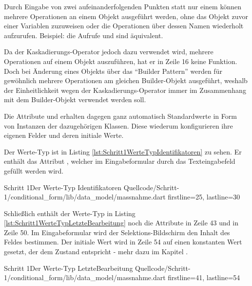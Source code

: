 Durch Eingabe von zwei aufeinanderfolgenden Punkten  statt nur einem  können mehrere Operationen an einem Objekt ausgeführt werden, ohne  das Objekt zuvor einer Variablen zuzuweisen oder die Operationen über dessen Namen wiederholt aufzurufen. Beispiel: die Aufrufe   und  sind äquivalent.

Da der Kaskadierungs-Operator jedoch dazu verwendet wird, mehrere Operationen auf einem Objekt auszuführen, hat er in Zeile 16 keine Funktion.
Doch bei Änderung eines Objekts über das \enquote{Builder Pattern} werden für gewöhnlich mehrere Operationen am gleichen Builder-Objekt ausgeführt, weshalb der Einheitlichkeit wegen der Kaskadierungs-Operator immer im Zusammenhang mit dem Builder-Objekt verwendet werden soll.

Die Attribute  und   erhalten dagegen ganz automatisch Standardwerte in Form von Instanzen der dazugehörigen Klassen.
Diese wiederum konfigurieren ihre eigenen Felder und deren initiale Werte.



Der Werte-Typ  ist in Listing \ref{lst:Schritt1WerteTypIdentifikatoren} zu sehen.
Er enthält das Attribut , welcher im Eingabeformular durch das Texteingabefeld gefüllt werden wird.

\begin{alexlisting}{Schritt 1}{Der Werte-Typ Identifikatoren}
  {Quellcode/Schritt-1/conditional_form/lib/data_model/massnahme.dart}
  {firstline=25, lastline=30}
  \label{lst:Schritt1WerteTypIdentifikatoren}
\end{alexlisting}

Schließlich enthält der Werte-Typ  in Listing \ref{lst:Schritt1WerteTypLetzteBearbeitung} noch die Attribute  in Zeile 43 und  in Zeile 50.
Im Eingabeformular wird der Selektions-Bildschirm den Inhalt des Feldes  bestimmen.
Der initiale Wert wird in Zeile 54 auf einen konstanten Wert gesetzt, der dem Zustand  entspricht - mehr dazu im Kapitel .

\begin{alexlisting}{Schritt 1}{Der Werte-Typ LetzteBearbeitung}
  {Quellcode/Schritt-1/conditional_form/lib/data_model/massnahme.dart}
  {firstline=41, lastline=54}
  \label{lst:Schritt1WerteTypLetzteBearbeitung}
\end{alexlisting}

